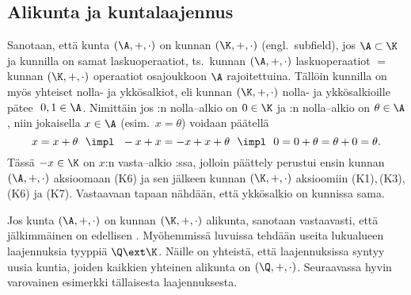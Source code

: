 \subsection{Alikunta ja kuntalaajennus}

Sanotaan, että kunta $(\A,+,\cdot)$ on kunnan $(\K,+,\cdot)$  (engl.\ subfield),
jos $\A \subset \K$ ja kunnilla on samat laskuoperaatiot, ts.\ kunnan $(\A,+,\cdot)$ 
laskuoperaatiot $=$ kunnan $(\K,+,\cdot)$ operaatiot osajoukkoon $\A$ rajoitettuina. Tällöin 
kunnilla on myös yhteiset nolla- ja ykkösalkiot, eli kunnan $(\K,+,\cdot)$ nolla- ja 
ykkösalkioille pätee $\ 0,1 \in \A$. Nimittäin jos \K:n nolla--alkio on $0 \in \K$ ja \A:n 
nolla--alkio on $\theta \in \A$, niin jokaisella $x \in \A$ (esim.\ $x=\theta$) voidaan päätellä
\[
x = x + \theta \ \ \impl \ \ -x + x = -x + x + \theta \ \ 
                     \impl \ \ 0 = 0+\theta = \theta+0 = \theta.
\]
Tässä $-x \in \K$ on $x$:n vasta--alkio \K:ssa, jolloin päättely perustui ensin kunnan 
$(\A,+,\cdot)$ aksioomaan (K6) ja sen jälkeen kunnan $(\K,+,\cdot)$ aksioomiin (K1),\,(K3), (K6)
ja (K7). Vastaavaan tapaan nähdään, että ykkösalkio on kunnissa sama. 

Jos kunta $(\A,+,\cdot)$ on kunnan $(\K,+,\cdot)$ alikunta, sanotaan vastaavasti, että 
jälkimmäinen on edellisen \kor{kuntalaajennus}. Myöhemmissä luvuissa tehdään useita lukualueen
laajennuksia tyyppiä $\Q \ext \K$. Näille on yhteistä, että laajennuksissa syntyy uusia kuntia,
joiden kaikkien yhteinen alikunta on $(\Q,+,\cdot)$. Seuraavassa hyvin varovainen esimerkki
tällaisesta laajennuksesta.

